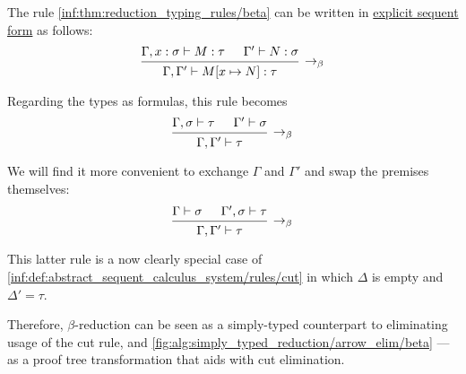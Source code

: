 \begin{remark}\label{rem:beta_reduction_and_cut_elimination}
  The rule \ref{inf:thm:reduction_typing_rules/beta} can be written in \hyperref[rem:natural_deduction_explicit_sequents]{explicit sequent form} as follows:
  \begin{equation*}
    \begin{prooftree}
      \hypo{ \Gamma, x: \sigma \vdash M: \tau }
      \hypo{ \Gamma' \vdash N: \sigma }
      \infer2[\ensuremath{ \rightarrow_\beta }]{ \Gamma, \Gamma' \vdash M[x \mapsto N]: \tau }
    \end{prooftree}
  \end{equation*}

  Regarding the types as formulas, this rule becomes
  \begin{equation*}
    \begin{prooftree}
      \hypo{ \Gamma, \sigma \vdash \tau }
      \hypo{ \Gamma' \vdash \sigma }
      \infer2[\ensuremath{ \rightarrow_\beta }]{ \Gamma, \Gamma' \vdash \tau }
    \end{prooftree}
  \end{equation*}

  We will find it more convenient to exchange \( \Gamma \) and \( \Gamma' \) and swap the premises themselves:
  \begin{equation*}
    \begin{prooftree}
      \hypo{ \Gamma \vdash \sigma }
      \hypo{ \Gamma', \sigma \vdash \tau }
      \infer2[\ensuremath{ \rightarrow_\beta }]{ \Gamma, \Gamma' \vdash \tau }
    \end{prooftree}
  \end{equation*}

  This latter rule is a now clearly special case of \ref{inf:def:abstract_sequent_calculus_system/rules/cut} in which \( \Delta \) is empty and \( \Delta' = \tau \).

  Therefore, \( \beta \)-reduction can be seen as a simply-typed counterpart to eliminating usage of the cut rule, and \cref{fig:alg:simply_typed_reduction/arrow_elim/beta} --- as a proof tree transformation that aids with cut elimination.
\end{remark}

